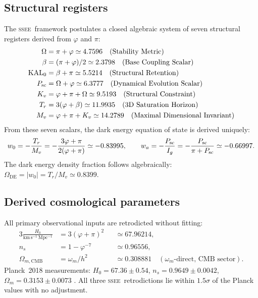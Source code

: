 \documentclass[12pt,a4paper]{article}
\newcommand{\SSEE}{\textsc{ssee}}
\newcommand{\phiG}{\varphi}
\newcommand{\KAL}{\mathrm{KAL}_0}
\newcommand{\Omde}{\Omega_{\mathrm{DE}}}
\newcommand{\Omm}{\Omega_{m}}
\newcommand{\OmmCMB}{\Omega_{m,\mathrm{CMB}}}
\newcommand{\wz}{w_0}
\newcommand{\wa}{w_a}
\begin{document}
\subsection{Structural registers}
\label{sec:registers}

The \SSEE\ framework postulates a closed algebraic system of seven structural
registers derived from $\phiG$ and $\pi$:
\begin{align}
  \Omega   &= \pi + \phiG                   \simeq 4.7596 \quad (\text{Stability Metric})  \nonumber\\
  \beta    &= (\pi + \phiG)/2               \simeq 2.3798 \quad (\text{Base Coupling Scalar}) \nonumber\\
  \KAL     &= \beta + \pi                   \simeq 5.5214 \quad (\text{Structural Retention}) \nonumber\\
  P_{\rm sc} &= \Omega + \phiG             \simeq 6.3777 \quad (\text{Dynamical Evolution Scalar}) \nonumber\\
  K_v      &= \phiG + \pi + \Omega         \simeq 9.5193 \quad (\text{Structural Constraint}) \nonumber\\
  T_r      &= 3(\phiG + \beta)             \simeq 11.9935\quad (\text{3D Saturation Horizon}) \nonumber\\
  M_v      &= \phiG + \pi + K_v           \simeq 14.2789\quad (\text{Maximal Dimensional Invariant})
  \label{eq:registers}
\end{align}
From these seven scalars, the dark energy equation of state is derived uniquely:
\begin{equation}
  \wz = -\frac{T_r}{M_v}
     = -\frac{3\phiG+\pi}{2(\phiG+\pi)} \simeq -0.83995,
  \qquad
  \wa = -\frac{P_{\rm sc}}{I_g}
     = -\frac{P_{\rm sc}}{\pi+P_{\rm sc}} \simeq -0.66997.
  \label{eq:wde}
\end{equation}
The dark energy density fraction follows algebraically:
$\Omde = |{\wz}| = T_r/M_v \simeq 0.8399$.

\subsection{Derived cosmological parameters}
\label{sec:params}

All primary observational inputs are retrodicted without fitting:
\begin{alignat}{3}
  \frac{H_0}{\mathrm{km\,s^{-1}\,Mpc^{-1}}} &= 3(\phiG+\pi)^2        &&\simeq 67.96214,  \label{eq:H0}\\
  n_s   &= 1 - \phiG^{-7}        &&\simeq 0.96556,  \label{eq:ns}\\
  \OmmCMB &= \omega_m/h^2 &&\simeq 0.308881 \quad (\omega_m\text{-direct, CMB sector}).
  \label{eq:Omm}
\end{alignat}
Planck~2018 measurements: $H_0 = 67.36\pm 0.54$, $n_s = 0.9649\pm 0.0042$,
$\Omm = 0.3153\pm 0.0073$ \citep{Planck2018}.
All three \SSEE\ retrodictions lie within $1.5\sigma$ of the Planck values
with no adjustment.
\end{document}
